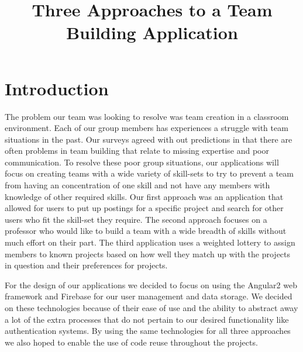 \documentclass[conference]{IEEEtran}
\begin{document}
\title{Three Approaches to a Team Building Application}

\author{
}


\maketitle

\section{Introduction}
The problem our team was looking to resolve was team creation in a classroom environment. Each of our group members has experiences a struggle with team situations in the past. Our surveys agreed with out predictions in that there are often problems in team building that relate to missing expertise and poor communication. To resolve these poor group situations, our applications will focus on creating teams with a wide variety of skill-sets to try to prevent a team from having an concentration of one skill and not have any members with knowledge of other required skills. Our first approach was an application that allowed for users to put up postings for a specific project and search for other users who fit the skill-set they require. The second approach focuses on a professor who would like to build a team with a wide breadth of skills without much effort on their part. The third application uses a weighted lottery to assign members to known projects based on how well they match up with the projects in question and their preferences for projects. 

For the design of our applications we decided to focus on using the Angular2 web framework and Firebase for our user management and data storage. We decided on these technologies because of their ease of use and the ability to abstract away a lot of the extra processes that do not pertain to our desired functionality like authentication systems. By using the same technologies for all three approaches we also hoped to enable the use of code reuse throughout the projects. 
\end{document}
